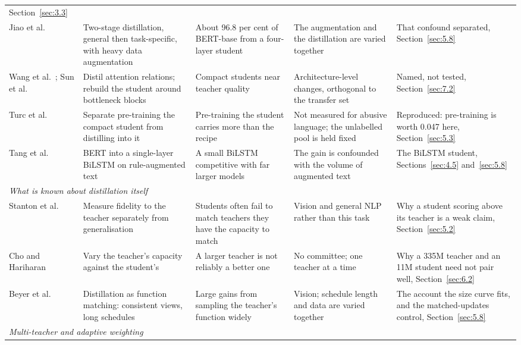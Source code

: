 \begin{center}
{\begin{longtable}{p{2.35cm}p{3.2cm}p{2.4cm}p{3.0cm}p{2.4cm}}
Section~\ref{sec:3.3} \\
Jiao et al.\ \cite{jiao2020tinybert} & Two-stage distillation, general then task-specific, with heavy
data augmentation & About 96.8 per cent of BERT-base from a four-layer student & The augmentation and
the distillation are varied together & That confound separated, Section~\ref{sec:5.8} \\
Wang et al.\ \cite{wang2020minilm}; Sun et al.\ \cite{sun2020mobilebert} & Distil attention relations;
rebuild the student around bottleneck blocks & Compact students near teacher quality & Architecture-level
changes, orthogonal to the transfer set & Named, not tested, Section~\ref{sec:7.2} \\
Turc et al.\ \cite{turc2019wellread} & Separate pre-training the compact student from distilling into
it & Pre-training the student carries more than the recipe & Not measured for abusive language; the
unlabelled pool is held fixed & Reproduced: pre-training is worth 0.047 here,
Section~\ref{sec:5.3} \\
Tang et al.\ \cite{tang2019distilling} & BERT into a single-layer BiLSTM on rule-augmented text & A
small BiLSTM competitive with far larger models & The gain is confounded with the volume of augmented
text & The BiLSTM student, Sections~\ref{sec:4.5} and~\ref{sec:5.8} \\
\midrule
\multicolumn{5}{l}{\emph{What is known about distillation itself}} \\*
Stanton et al.\ \cite{stanton2021does} & Measure fidelity to the teacher separately from
generalisation & Students often fail to match teachers they have the capacity to match & Vision and
general NLP rather than this task & Why a student scoring above its teacher is a weak claim,
Section~\ref{sec:5.2} \\
Cho and Hariharan \cite{cho2019efficacy} & Vary the teacher's capacity against the student's & A larger
teacher is not reliably a better one & No committee; one teacher at a time & Why a 335M teacher and an
11M student need not pair well, Section~\ref{sec:6.2} \\
Beyer et al.\ \cite{beyer2022knowledge} & Distillation as function matching: consistent views, long
schedules & Large gains from sampling the teacher's function widely & Vision; schedule length and data
are varied together & The account the size curve fits, and the matched-updates control,
Section~\ref{sec:5.8} \\
\midrule
\multicolumn{5}{l}{\emph{Multi-teacher and adaptive weighting}} \\*

\end{longtable}}
\end{center}
